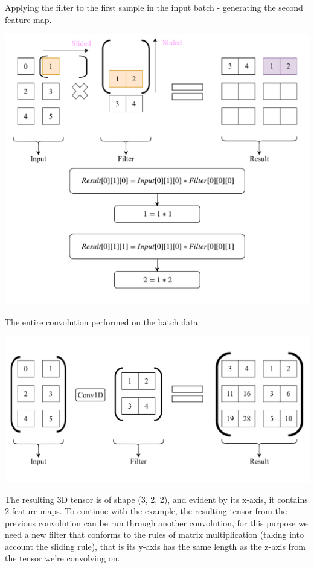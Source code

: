 \documentclass[12pt]{article}
\newcommand\tab[1][1cm]{\hspace*{#1}}
\begin{document}
\begin{blockfigure}{ Applying the filter to the first sample in the input batch - generating the second feature map.}
	\begin{center}
		\includegraphics[width=\textwidth]{firstConvSample_step3}
	\end{center}
\end{blockfigure}
\begin{blockfigure}{ The entire convolution performed on the batch data.}
		\begin{center}
			\includegraphics[width=\textwidth]{firstConvSample_final}
		\end{center}
\end{blockfigure}
\tab The resulting 3D tensor is of shape (3, 2, 2), and evident by its x-axis, it contains 2 feature \tab maps.
\newpage
To continue with the example, the resulting tensor from the previous convolution can be run through another convolution, for this purpose we need a new filter that conforms to the rules of matrix multiplication (taking into account the sliding rule), that is its y-axis has the same length as the z-axis from the tensor we're convolving on.\\\\
\end{document}
